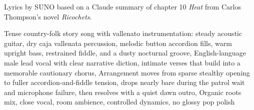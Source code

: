 
\begin{notes}
Lyrics by SUNO based on a Claude summary of chapter 10 \emph{Heat} from Carlos Thompson's novel \emph{Ricochets}.
\end{notes}
\begin{style}
Tense country-folk story song with vallenato instrumentation: steady acoustic guitar, dry caja vallenata percussion, melodic button accordion fills, warm upright bass, restrained fiddle, and a dusty nocturnal groove, English-language male lead vocal with clear narrative diction, intimate verses that build into a memorable cautionary chorus, Arrangement moves from sparse stealthy opening to fuller accordion-and-fiddle tension, drops nearly bare during the patrol wait and microphone failure, then resolves with a quiet dawn outro, Organic roots mix, close vocal, room ambience, controlled dynamics, no glossy pop polish
\end{style}
